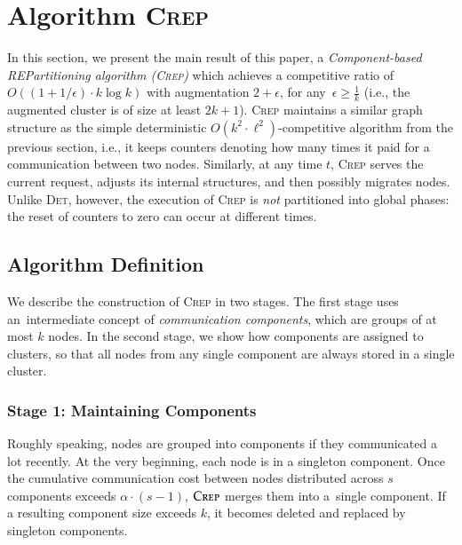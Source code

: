 \documentclass[11pt,a4paper]{scrartcl}
\newcommand{\CREP}{\textsc{Crep}\xspace}
\newcommand{\DET}{\textsc{Det}\xspace}
\newcommand{\eps}{\ensuremath{\epsilon}}
\begin{document}

\section{Algorithm \textsc{Crep}}
\label{sec:crep}

In this section, we present the main result of this paper, a
\emph{Component-based REPartitioning algorithm (\CREP)} which achieves a
competitive ratio of $O((1 + 1/\eps) \cdot k \log k)$ with augmentation
$2+\eps$, for any~$\eps \geq \frac{1}{k}$ (i.e., the augmented cluster
is of size at least $2k+1$). \CREP maintains a similar graph structure as the
simple deterministic $O(k^2 \cdot \ell^2)$-competitive algorithm from the
previous section, i.e., it keeps counters denoting how many times it paid for a
communication between two nodes. Similarly, at any time $t$,
\CREP serves the current request, adjusts its internal structures, and then
possibly migrates nodes. Unlike \DET, however, the execution of \CREP is
\emph{not} partitioned into global phases: the reset of counters to zero can
occur at different times.


\subsection{Algorithm Definition}

We describe the construction of \CREP in two stages. The first stage uses
an~intermediate concept of \emph{communication components}, which are groups of at
most $k$ nodes. In the second stage, we show how components are assigned to
clusters, so that all nodes from any single component are always stored in a
single cluster.


\subsubsection{Stage 1: Maintaining Components}

Roughly speaking, nodes are grouped into components if they communicated a lot
recently. At the very beginning, each node is in a singleton component. Once
the cumulative communication cost between nodes distributed across $s$
components exceeds $\alpha \cdot (s-1)$, $\CREP$ merges them into a~single
component. If a resulting component size exceeds $k$, it becomes deleted and
replaced by singleton components.
\end{document}
